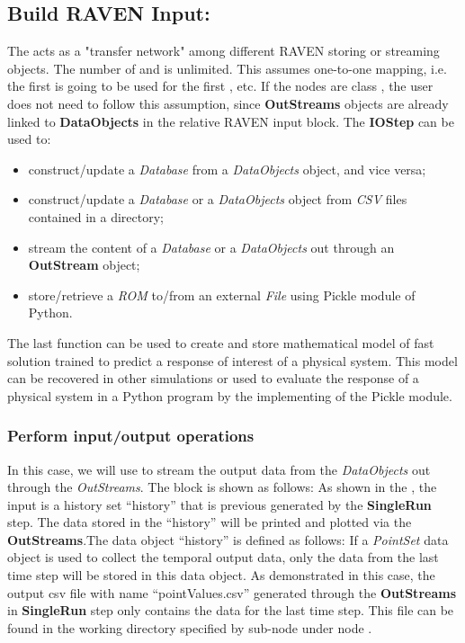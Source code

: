 \subsection{Build RAVEN Input: }
The  acts as a "transfer network" among different RAVEN storing or streaming objects. The number
of  and  is unlimited. This  assumes one-to-one mapping, i.e. the first
 is going to be used for the first , etc. \nb If the  nodes are class
, the user does not need to follow this assumption, since \textbf{OutStreams} objects are already
linked to \textbf{DataObjects} in the relative RAVEN input block.
The \textbf{IOStep} can be used to:
\begin{itemize}
  \item construct/update a \textit{Database} from a \textit{DataObjects} object, and vice versa;
  \item construct/update a \textit{Database} or a \textit{DataObjects} object from
    \textit{CSV} files contained in a directory;
  \item stream the content of a \textit{Database} or a \textit{DataObjects} out through an \textbf{OutStream} object;
  \item store/retrieve a \textit{ROM} to/from an external \textit{File} using Pickle module of Python.
\end{itemize}
The last function can be used to create and store mathematical model of fast solution trained to predict a
response of interest of a physical system. This model can be recovered in other simulations or used to evaluate
the response of a physical system in a Python program by the implementing of the Pickle module.

\subsubsection{Perform input/output operations}
In this case, we will use  to stream the output data from the \textit{DataObjects} out through the
\textit{OutStreams}. The  block is shown as follows:
As shown in the , the input is a history set ``history'' that is previous generated by the \textbf{SingleRun}
step. The data stored in the ``history'' will be printed and plotted via the \textbf{OutStreams}.The data object
``history'' is defined as follows:
\nb If a \textit{PointSet} data object is used to collect the temporal output data, only the data from the last time
step will be stored in this data object. As demonstrated in this case, the output csv file with name ``pointValues.csv''
generated through the \textbf{OutStreams} in \textbf{SingleRun} step only contains the data for the last time step.
This file can be found in the working directory specified by sub-node  under node .

